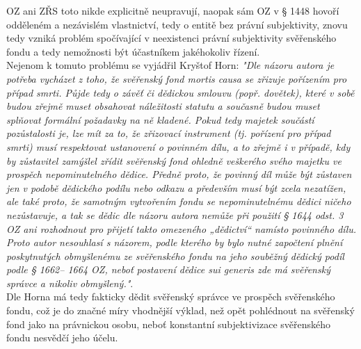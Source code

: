 \documentclass{article}
\begin{document}
 OZ ani ZŘS toto nikde explicitně neupravují, naopak sám OZ v § 1448 hovoří odděleném a nezávislém vlastnictví, tedy o entitě bez právní subjektivity, znovu tedy vzniká problém spočívající v neexistenci právní subjektivity svěřenského fondu a tedy nemožnosti být účastníkem jakéhokoliv řízení.\\
 
 Nejenom k tomuto problému se vyjádřil Kryštof Horn: \textit{"Dle názoru autora je potřeba vycházet z toho, že svěřenský fond mortis causa se zřizuje pořízením pro případ smrti. Půjde tedy o závěť či dědickou smlouvu (popř. dovětek), které v sobě budou zřejmě muset obsahovat náležitosti statutu a současně budou muset splňovat formální požadavky na ně kladené. Pokud tedy majetek součástí pozůstalosti je, lze mít za to, že zřizovací instrument (tj. pořízení pro případ smrti) musí respektovat ustanovení o povinném dílu, a to zřejmě i v případě, kdy by zůstavitel zamýšlel zřídit svěřenský fond ohledně veškerého svého majetku ve prospěch nepominutelného dědice. Předně proto, že povinný díl může být zůstaven jen v podobě dědického podílu nebo odkazu a především musí být zcela nezatížen, ale také proto, že samotným vytvořením fondu se nepominutelnému dědici ničeho nezůstavuje, a tak se dědic dle názoru autora nemůže při použití § 1644 odst. 3 OZ ani rozhodnout pro přijetí takto omezeného „dědictví“ namísto povinného dílu. Proto autor nesouhlasí s názorem, podle kterého by bylo nutné započtení plnění poskytnutých obmyšlenému ze svěřenského fondu na jeho souběžný dědický podíl podle § 1662– 1664 OZ, neboť postavení dědice sui generis zde má svěřenský správce a nikoliv obmyšlený."}.\\
 
 Dle Horna má tedy fakticky dědit svěřenský správce ve prospěch svěřenského fondu, což je do značné míry vhodnější výklad, než opět pohlédnout na svěřenský fond jako na právnickou osobu, neboť konstantní subjektivizace svěřenského fondu nesvědčí jeho účelu.\\
 
\end{document}
